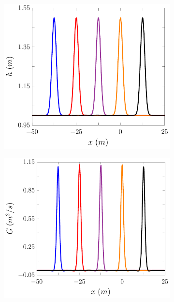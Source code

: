 \begin{figure}
\begin{subfigure}{0.5\textwidth}
		\includegraphics[width=\textwidth]{./chp5/figures/Forced/Wet/FEVMh.pdf}
		\vspace{0.5cm}
	\end{subfigure}
	\begin{subfigure}{0.5\textwidth}
		\includegraphics[width=\textwidth]{./chp5/figures/Forced/Wet/FEVMG.pdf}
	\end{subfigure}%
	\begin{subfigure}{0.5\textwidth}

\end{subfigure}
\end{figure}
